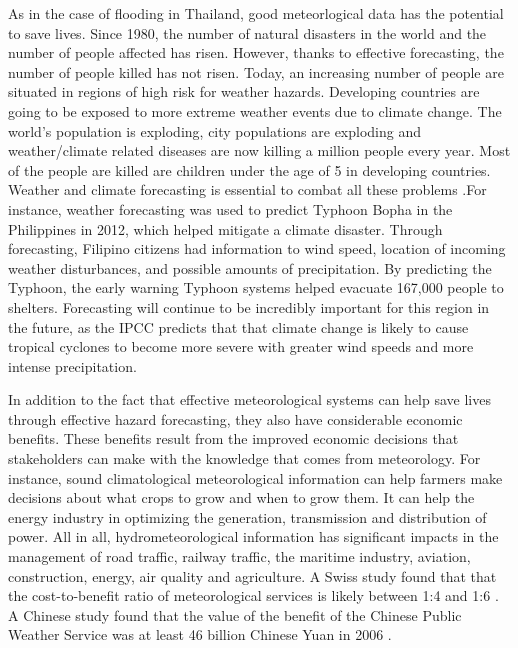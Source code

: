 As in the case of flooding in Thailand, good meteorlogical data has the potential to save lives. Since 1980, the number of natural disasters in the world and the number of people affected has risen. However, thanks to effective forecasting, the number of people killed has not risen. Today, an increasing number of people are situated in regions of high risk for weather hazards. Developing countries are going to be exposed to more extreme weather events due to climate change. The world's population is exploding, city populations are exploding and weather/climate related diseases are now killing a million people every year. Most of the people are killed are children under the age of 5 in developing countries. Weather and climate forecasting is essential to combat all these problems \citep{preparedness}.For instance, weather forecasting was used to predict Typhoon Bopha in the Philippines in 2012, which helped mitigate a climate disaster. Through forecasting, Filipino citizens had information to wind speed, location of incoming weather disturbances, and possible amounts of precipitation. By predicting the Typhoon, the early warning Typhoon systems helped evacuate 167,000 people to shelters. Forecasting will continue to be incredibly important for this region in the future, as the IPCC predicts that that climate change is likely to cause tropical cyclones to become more severe with greater wind speeds and more intense precipitation.\citep{typhoon} 

In addition to the fact that effective meteorological systems can help save lives through effective hazard forecasting, they also have considerable economic benefits. These benefits result from the improved economic decisions that stakeholders can make with the knowledge that comes from meteorology. For instance, sound climatological meteorological information can help farmers make decisions about what crops to grow and when to grow them. It can help the energy industry in optimizing the generation, transmission and distribution of power. All in all, hydrometeorological information has significant impacts in the management of road traffic, railway traffic, the maritime industry, aviation, construction, energy, air quality and agriculture. A Swiss study found that that the cost-to-benefit ratio of meteorological services is likely between 1:4 and 1:6 \citep{swissmeteo}. A Chinese study found that the value of the benefit of the Chinese Public Weather Service was at least 46 billion Chinese Yuan in 2006 \citep{chineseservice}. 




